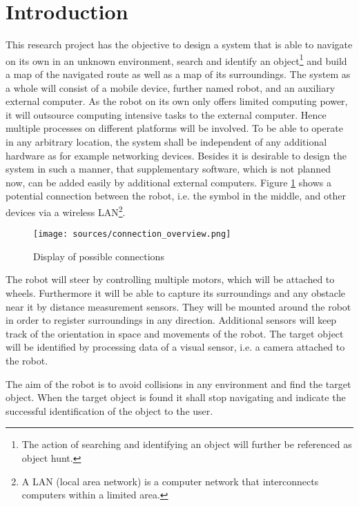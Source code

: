 \cleardoublepage
\pagestyle{fancy} %
\fancyhead{}
\fancyhf{}
\renewcommand{\headrulewidth}{0pt}
\renewcommand{\footrulewidth}{0.4pt}

\section{Introduction}

This research project has the objective to design a system that is able to navigate on its own in an unknown environment, search and identify an object\footnote{The action of searching and identifying an object will further be referenced as object hunt.} and build a map of the navigated route as well as a map of its surroundings. The system as a whole will consist of a mobile device, further named robot, and an auxiliary external computer. As the robot on its own only offers limited computing power, it will outsource computing intensive tasks to the external computer. Hence multiple processes on different platforms will be involved. To be able to operate in any arbitrary location, the system shall be independent of any additional hardware as for example networking devices. Besides it is desirable to design the system in such a manner, that supplementary software, which is not planned now, can be added easily by additional external computers. Figure \ref{fig:connection} shows a potential connection between the robot, i.e. the symbol in the middle, and other devices via a wireless LAN\footnote{A LAN (local area network) is a computer network that interconnects computers within a limited area.}.

\begin{figure}[H]
\centering
\texttt{[image: sources/connection\_overview.png]}
\caption[Display of possible connections]{Display of possible connections}
\label{fig:connection}
\end{figure}

The robot will steer by controlling multiple motors, which will be attached to wheels. Furthermore it will be able to capture its surroundings and any obstacle near it by distance measurement sensors. They will be mounted around the robot in order to register surroundings in any direction. Additional sensors will keep track of the orientation in space and movements of the robot. The target object will be identified by processing data of a visual sensor, i.e. a camera attached to the robot.

The aim of the robot is to avoid collisions in any environment and find the target object. When the target object is found it shall stop navigating and indicate the successful identification of the object to the user.




